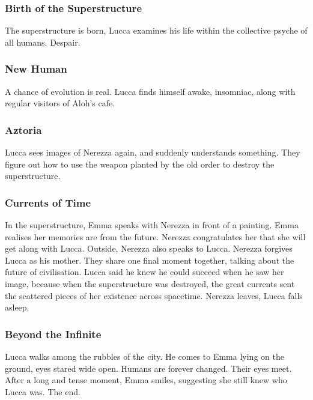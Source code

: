 \documentclass[11pt]{article}
\begin{document}
		\subsubsection{Birth of the Superstructure}
		The superstructure is born, Lucca examines his life within the collective psyche of all humans. 
		Despair.
		\subsubsection{New Human}
		A chance of evolution is real. 
		Lucca finds himself awake, insomniac, along with regular visitors of Aloh's cafe.
		\subsubsection{Aztoria}
		Lucca sees images of Nerezza again, and suddenly understands something.
		They figure out how to use the weapon planted by the old order to destroy the superstructure.
		\subsubsection{Currents of Time}
		In the superstructure, Emma speaks with Nerezza in front of a painting.
		Emma realises her memories are from the future.
		Nerezza congratulates her that she will get along with Lucca.
		Outside, Nerezza also speaks to Lucca.
		Nerezza forgives Lucca as his mother. 
		They share one final moment together, talking about the future of civilisation.
		Lucca said he knew he could succeed when he saw her image, because when the superstructure was destroyed, the great currents sent the scattered pieces of her existence across spacetime.
		Nerezza leaves, Lucca falls asleep.
		\subsubsection{Beyond the Infinite}
		Lucca walks among the rubbles of the city. He comes to Emma lying on the ground, eyes stared wide open. 
		Humans are forever changed.
		Their eyes meet.
		After a long and tense moment, Emma smiles, suggesting she still knew who Lucca was. 
		The end.
\end{document}
